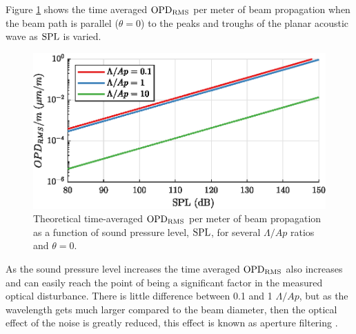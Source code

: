 Figure \ref{fig:03_planar_sample_calc_3} shows the time averaged $\operatorname{OPD_{RMS}}$ per meter of beam propagation when the beam path is parallel ($\theta=0$) to the peaks and troughs of the planar acoustic wave as $\operatorname{SPL}$ is varied.
\begin{figure}
  \centering
  \includegraphics{../matlab/03_aero_optics_acoustics/planar_sample_calc_3.eps}
  \caption{Theoretical time-averaged $\operatorname{OPD_{RMS}}$ per meter of beam propagation as a function of sound pressure level, $\operatorname{SPL}$, for several $\Lambda/Ap$ ratios and $\theta=0$.}
  \label{fig:03_planar_sample_calc_3}
\end{figure}
As the sound pressure level increases the time averaged $\operatorname{OPD_{RMS}}$ also increases and can easily reach the point of being a significant factor in the measured optical disturbance.
There is little difference between 0.1 and 1 $\Lambda/Ap$, but as the wavelength gets much larger compared to the beam diameter, then the optical effect of the noise is greatly reduced, this effect is known as aperture filtering \cite{Siegenthaler-2005-KQ2HGmfp}.

